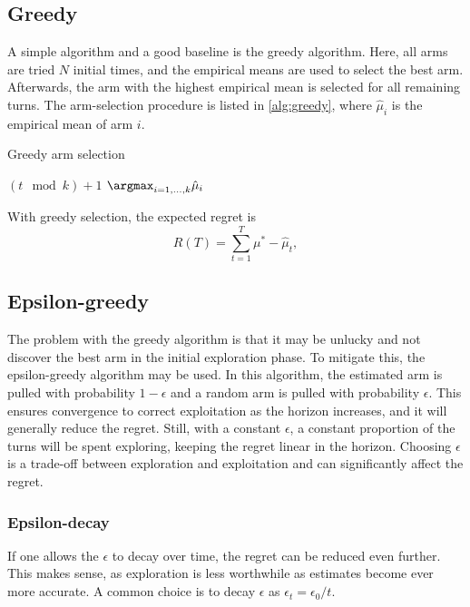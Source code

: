 \subsection{Greedy}
A simple algorithm and a good baseline is the greedy algorithm.
Here, all arms are tried $N$ initial times, and the empirical means are used to select the best arm.
Afterwards, the arm with the highest empirical mean is selected for all remaining turns.
The arm-selection procedure is listed in \cref{alg:greedy}, where $\hat{\mu}_i$ is the empirical mean of arm $i$.
\begin{algorithm}
    \caption{Greedy arm selection}
    \label{alg:greedy}
    \begin{algorithmic}
        \State \Return $(t \mod k) + 1$
        \Else
        \State \Return $\argmax_{i=1,\dots,k} \hat{\mu}_i$
        \EndIf
        \EndProcedure
    \end{algorithmic}
\end{algorithm}

With greedy selection, the expected regret is
\begin{equation}
    R(T) = \sum_{t=1}^T \mu^* - \hat{\mu}_t,
\end{equation}



\subsection{Epsilon-greedy}
The problem with the greedy algorithm is that it may be unlucky and not discover the best arm in the initial exploration phase.
To mitigate this, the epsilon-greedy algorithm may be used.
In this algorithm, the estimated arm is pulled with probability $1-\epsilon$ and a random arm is pulled with probability $\epsilon$.
This ensures convergence to correct exploitation as the horizon increases, and it will generally reduce the regret.
Still, with a constant $\epsilon$, a constant proportion of the turns will be spent exploring, keeping the regret linear in the horizon.
Choosing $\epsilon$ is a trade-off between exploration and exploitation and can significantly affect the regret.

\subsubsection{Epsilon-decay}
If one allows the $\epsilon$ to decay over time, the regret can be reduced even further.
This makes sense, as exploration is less worthwhile as estimates become ever more accurate.
A common choice is to decay $\epsilon$ as $\epsilon_t = \epsilon_0 / t$.


